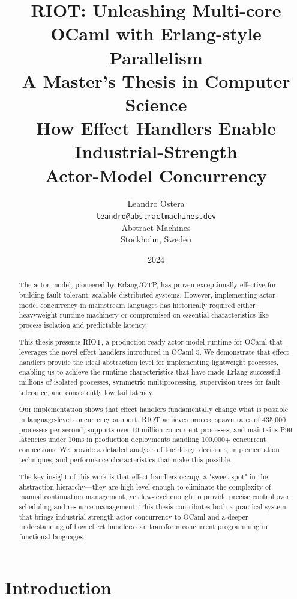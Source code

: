 \documentclass[12pt,a4paper]{report}
\title{{\Huge RIOT: Unleashing Multi-core OCaml with Erlang-style Parallelism}\\[1cm]
{\Large A Master's Thesis in Computer Science}\\[2cm]
{\large How Effect Handlers Enable Industrial-Strength\\Actor-Model Concurrency}}
\author{Leandro Ostera\\
\texttt{leandro@abstractmachines.dev}\\[1cm]
Abstract Machines\\
Stockholm, Sweden}
\date{2024}
\begin{document}
\maketitle

\begin{abstract}
\thispagestyle{empty}

The actor model, pioneered by Erlang/OTP, has proven exceptionally effective for building fault-tolerant, scalable distributed systems. However, implementing actor-model concurrency in mainstream languages has historically required either heavyweight runtime machinery or compromised on essential characteristics like process isolation and predictable latency. 

This thesis presents RIOT, a production-ready actor-model runtime for OCaml that leverages the novel effect handlers introduced in OCaml 5. We demonstrate that effect handlers provide the ideal abstraction level for implementing lightweight processes, enabling us to achieve the runtime characteristics that have made Erlang successful: millions of isolated processes, symmetric multiprocessing, supervision trees for fault tolerance, and consistently low tail latency.

Our implementation shows that effect handlers fundamentally change what is possible in language-level concurrency support. RIOT achieves process spawn rates of 435,000 processes per second, supports over 10 million concurrent processes, and maintains P99 latencies under 10ms in production deployments handling 100,000+ concurrent connections. We provide a detailed analysis of the design decisions, implementation techniques, and performance characteristics that make this possible.

The key insight of this work is that effect handlers occupy a "sweet spot" in the abstraction hierarchy—they are high-level enough to eliminate the complexity of manual continuation management, yet low-level enough to provide precise control over scheduling and resource management. This thesis contributes both a practical system that brings industrial-strength actor concurrency to OCaml and a deeper understanding of how effect handlers can transform concurrent programming in functional languages.
\end{abstract}

\tableofcontents
\listoffigures
\listoftables

\chapter{Introduction}
\end{document}
